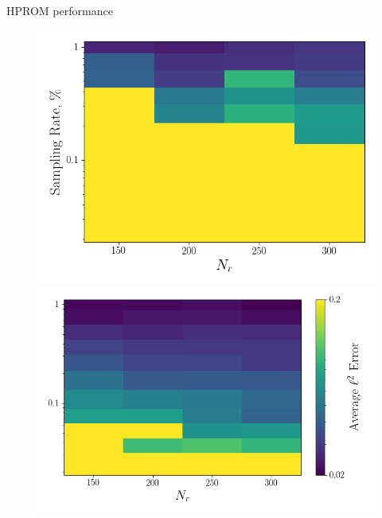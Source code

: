 \documentclass[]{beamer}
\begin{document}
\begin{frame}{HPROM performance}
	\begin{figure}
		\begin{minipage}{0.35\linewidth}
			\includegraphics[width=0.99\linewidth]{Images/experiments/cvrc/err_contour_random_dt5e-7.png}
		\end{minipage}
		\begin{minipage}{0.4\linewidth}
			\includegraphics[width=0.99\linewidth]{Images/experiments/cvrc/err_contour_eigenvec_dt5e-7.png}
		\end{minipage}
	

\end{figure}
\end{frame}
\end{document}
